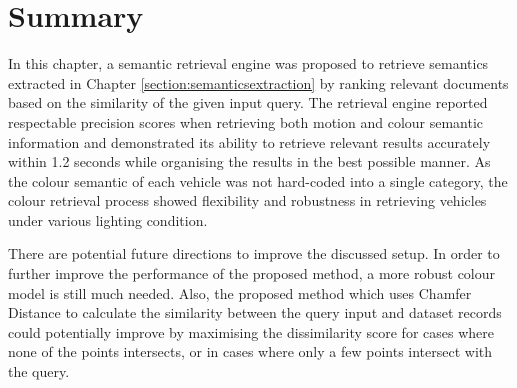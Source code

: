 \begin{table}[tb!]
	\centering
	\caption{Comparison between Methods: Compression Ratio Using Trajectory/Tracklet Features}
	\label{tab:compareresult}
\vspace{-0.6em}
\end{table}


\section{Summary}

In this chapter, a semantic retrieval engine was proposed to retrieve semantics extracted in Chapter \ref{section:semanticsextraction} by ranking relevant documents based on the similarity of the given input query.
The retrieval engine reported respectable precision scores when retrieving both motion and colour semantic information and demonstrated its ability to retrieve relevant results accurately within 1.2 seconds while organising the results in the best possible manner. As the colour semantic of each vehicle was not hard-coded into a single category, the colour retrieval process showed flexibility and robustness in retrieving vehicles under various lighting condition.

There are potential future directions to improve the discussed setup. In order to further improve the performance of the proposed method, a more robust colour model is still much needed. Also, the proposed method which
uses Chamfer Distance to calculate the similarity between the query input and dataset records could potentially improve by maximising the dissimilarity score for cases where none of the points intersects, or in cases where only a few points intersect with the query.



